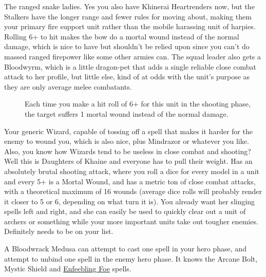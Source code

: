 The ranged snake ladies. Yes you also have Khinerai Heartrenders now, but the
Stalkers have the longer range and fewer rules for moving about, making them
your primary fire support unit rather than the mobile harassing unit of
harpies. Rolling 6+ to hit makes the bow do a mortal wound instead of the
normal damage, which is nice to have but shouldn't be relied upon since you
can't do massed ranged firepower like some other armies can. The squad leader
also gets a Bloodwyrm, which is a little dragon-pet that adds a single reliable
close combat attack to her profile, but little else, kind of at odds with the
unit's purpose as they are only average melee combatants.\\ 

\begin{description}
    \item [] Each time you make a hit roll
        of 6+ for this unit in the shooting phase, the target suffers 1 mortal
        wound instead of the normal damage.
\end{description}

Your generic Wizard, capable of tossing off a spell that makes it harder for
the enemy to wound you, which is also nice, plus Mindrazor or whatever you
like. Also, you know how Wizards tend to be useless in close combat and
shooting? Well this is Daughters of Khaine and everyone has to pull their
weight. Has an absolutely brutal shooting attack, where you roll a dice for
every model in a unit and every 5+ is a Mortal Wound, and has a metric ton of
close combat attacks, with a theoretical maximum of 16 wounds (average dice
rolls will probably render it closer to 5 or 6, depending on what turn it is).
You already want her slinging spells left and right, and she can easily be used
to quickly clear out a unit of archers or something while your more important
units take out tougher enemies. Definitely needs to be on your list.

A Bloodwrack Medusa can attempt to cast one spell in your hero phase, and
attempt to unbind one spell in the enemy hero phase. It knows the Arcane Bolt,
Mystic Shield and \hyperref[spell:enfeebling-foe]{Enfeebling Foe} spells.\\

